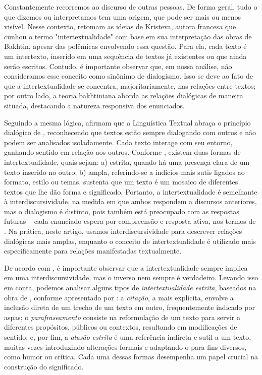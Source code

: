 Constantemente recorremos ao discurso de outras pessoas. De forma geral,
tudo o que dizemos ou interpretamos tem uma origem, que pode ser mais ou
menos visível. Nesse contexto, \textcite{koch2008} retomam
as ideias de Kristeva, autora francesa que cunhou o termo
"intertextualidade" com base em sua interpretação das obras de Bakhtin,
apesar das polêmicas envolvendo essa questão. Para ela, cada texto é um
intertexto, inserido em uma sequência de textos já existentes ou que
ainda serão escritos. Contudo, é importante observar que, em nossa
análise, não consideramos esse conceito como sinônimo de dialogismo.
Isso se deve ao fato de que a intertextualidade se concentra,
majoritariamente, nas relações entre textos; por outro lado, a teoria
bakhtiniana aborda as relações dialógicas de maneira situada, destacando
a natureza responsiva dos enunciados.

Seguindo a mesma lógica, \textcite{koch2008} afirmam que a
Linguística Textual abraça o princípio dialógico de \textcite{bakhtin_marxismo_2009}, reconhecendo que textos estão sempre dialogando com outros e não
podem ser analisados isoladamente. Cada texto interage com seu entorno,
ganhando sentido em relação aos outros. Conforme \textcite{koch2008}, existem duas formas de intertextualidade, quais
sejam: a) estrita, quando há uma presença clara de um texto inserido no
outro; b) ampla, referindo-se a indícios mais sutis ligados ao formato,
estilo ou temas. 
sustenta que um texto é um mosaico de diferentes textos que lhe dão forma e significado. Portanto, a intertextualidade é semelhante à interdiscursividade, na
medida em que ambos respondem a discursos anteriores, mas o dialogismo é
distinto, pois também está preocupado com as respostas futuras -- cada
enunciado espera por compreensão e resposta ativa, nos termos de \textcite{fiorin_interdiscursividade_2006}. Na prática, neste artigo, usamos interdiscursividade para
descrever relações dialógicas mais amplas, enquanto o conceito de
intertextualidade é utilizado mais especificamente para relações
manifestadas textualmente.

De acordo com \textcite{fiorin_interdiscursividade_2006}, é importante observar que a
intertextualidade sempre implica em uma interdiscursividade, mas o
inverso nem sempre é verdadeiro. Levando isso em conta, podemos analisar
alguns tipos de \emph{intertextualidade estrita}, baseados na obra de
\textcite{genette_palimpsestos:_2010}, conforme apresentado por \textcite{koch2008}: a \emph{citação}, a mais explícita, envolve a inclusão direta de
um trecho de um texto em outro, frequentemente indicado por aspas; o
\emph{parafraseamento} consiste na reformulação de um texto para servir
a diferentes propósitos, públicos ou contextos, resultando em
modificações de sentido; e, por fim, a \emph{alusão estrita} é uma
referência indireta e sutil a um texto, muitas vezes introduzindo
alterações formais e adaptando-o para fins diversos, como humor ou
crítica. Cada uma dessas formas desempenha um papel crucial na
construção do significado.